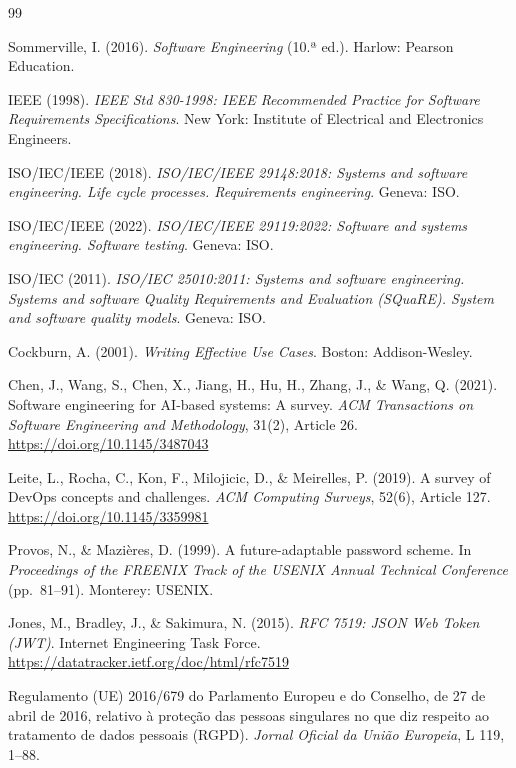 
\begin{thebibliography}{99}

Sommerville, I. (2016). \textit{Software Engineering} (10.ª ed.). Harlow: Pearson Education.

IEEE (1998). \textit{IEEE Std 830-1998: IEEE Recommended Practice for Software Requirements Specifications}. New York: Institute of Electrical and Electronics Engineers.

ISO/IEC/IEEE (2018). \textit{ISO/IEC/IEEE 29148:2018: Systems and software engineering. Life cycle processes. Requirements engineering}. Geneva: ISO.

ISO/IEC/IEEE (2022). \textit{ISO/IEC/IEEE 29119:2022: Software and systems engineering. Software testing}. Geneva: ISO.

ISO/IEC (2011). \textit{ISO/IEC 25010:2011: Systems and software engineering. Systems and software Quality Requirements and Evaluation (SQuaRE). System and software quality models}. Geneva: ISO.

Cockburn, A. (2001). \textit{Writing Effective Use Cases}. Boston: Addison-Wesley.

Chen, J., Wang, S., Chen, X., Jiang, H., Hu, H., Zhang, J., \& Wang, Q. (2021). Software engineering for AI-based systems: A survey. \textit{ACM Transactions on Software Engineering and Methodology}, 31(2), Article 26. \url{https://doi.org/10.1145/3487043}

Leite, L., Rocha, C., Kon, F., Milojicic, D., \& Meirelles, P. (2019). A survey of DevOps concepts and challenges. \textit{ACM Computing Surveys}, 52(6), Article 127. \url{https://doi.org/10.1145/3359981}

Provos, N., \& Mazières, D. (1999). A future-adaptable password scheme. In \textit{Proceedings of the FREENIX Track of the USENIX Annual Technical Conference} (pp.~81--91). Monterey: USENIX.

Jones, M., Bradley, J., \& Sakimura, N. (2015). \textit{RFC 7519: JSON Web Token (JWT)}. Internet Engineering Task Force. \url{https://datatracker.ietf.org/doc/html/rfc7519}

Regulamento (UE) 2016/679 do Parlamento Europeu e do Conselho, de 27 de abril de 2016, relativo à proteção das pessoas singulares no que diz respeito ao tratamento de dados pessoais (RGPD). \textit{Jornal Oficial da União Europeia}, L 119, 1--88.


\end{thebibliography}
